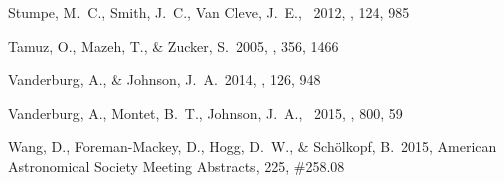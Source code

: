\documentclass[12pt,preprint]{aastex}
\begin{document}
\begin{thebibliography}{}
Stumpe, M.~C., Smith, J.~C., Van Cleve, J.~E., \etal\ 2012, \pasp, 124, 985

Tamuz, O., Mazeh, T., \& Zucker, S.\ 2005, \mnras, 356, 1466

Vanderburg, A., \& Johnson, J.~A.\ 2014, \pasp, 126, 948

Vanderburg, A., Montet, B.~T., Johnson, J.~A., \etal\ 2015, \apj, 800, 59

Wang, D., Foreman-Mackey, D., Hogg, D.~W., \& Sch{\"o}lkopf, B.\ 2015,
American Astronomical Society Meeting Abstracts, 225, \#258.08

\end{thebibliography}
\end{document}
